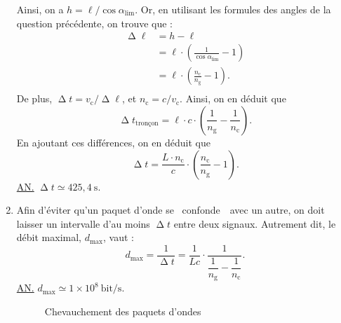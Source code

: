 \begin{enumerate}
		Ainsi, on a $h = \ell / \cos \alpha_\mathrm{lim}$. Or, en utilisant les formules des angles de la question précédente, on trouve que :
		\begin{align*}
			\upDelta \ell &= h - \ell \\
			&= \ell \cdot \left( \frac{1}{\cos \alpha_\mathrm{lim}} - 1 \right)  \\
			&= \ell\cdot \left( \frac{n_\mathrm{c}}{n_\mathrm{g}} - 1 \right). \\
		\end{align*}
		De plus, $\upDelta t = v_\mathrm{c} / \upDelta \ell$, et $n_\mathrm{c} = c / v_\mathrm{c}$. Ainsi, on en déduit que \[
			\upDelta t_\text{tronçon}  = \ell \cdot c \cdot \left( \frac{1}{n_\mathrm{g}} - \frac{1}{n_\mathrm{c}} \right)
		.\]
		En ajoutant ces différences, on en déduit que \[
			\upDelta t = \frac{L \cdot n_\mathrm{c}}{c} \cdot \left( \frac{n_\mathrm{c}}{n_\mathrm{g}} - 1 \right)
		.\]
		\underline{AN.} $\upDelta t \simeq 425{,}4\:\mathrm{s}$.
	\item Afin d'éviter qu'un paquet d'onde se \guillemotleft~confonde~\guillemotright\ avec un autre, on doit laisser un intervalle d'au moins $\upDelta t$ entre deux signaux. Autrement dit, le débit maximal, $d_\mathrm{max}$, vaut : \[
			d_\mathrm{max} = \frac{1}{\upDelta t} = \frac{1}{Lc} \cdot \frac{1}{\dfrac{1}{n_\mathrm{g}} - \dfrac{1}{n_\mathrm{c}}}
		.\]
		\underline{AN.} $d_\mathrm{max} \simeq 1 \times 10^8\:\mathrm{bit/s}$.

		\begin{figure}[H]
			\centering
			
			\caption{Chevauchement des paquets d'ondes}
		\end{figure}
\end{enumerate}
